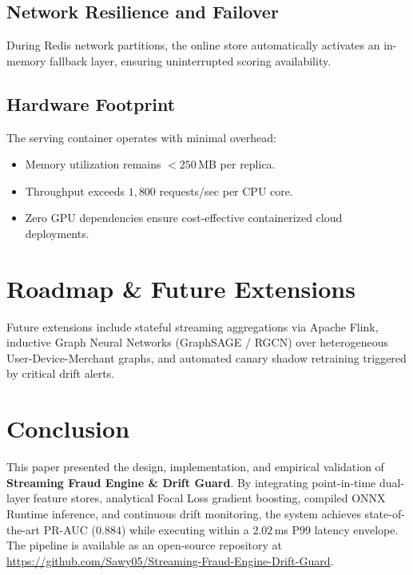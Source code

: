 \subsection{Network Resilience and Failover}
During Redis network partitions, the online store automatically activates an in-memory fallback layer, ensuring uninterrupted scoring availability.

\subsection{Hardware Footprint}
The serving container operates with minimal overhead:
\begin{itemize}
    \item Memory utilization remains $< 250$\,MB per replica.
    \item Throughput exceeds $1,800$ requests/sec per CPU core.
    \item Zero GPU dependencies ensure cost-effective containerized cloud deployments.
\end{itemize}

\section{Roadmap \& Future Extensions}
\label{sec:roadmap}
Future extensions include stateful streaming aggregations via Apache Flink, inductive Graph Neural Networks (GraphSAGE / RGCN) over heterogeneous User-Device-Merchant graphs, and automated canary shadow retraining triggered by critical drift alerts.

\section{Conclusion}
\label{sec:conclusion}
This paper presented the design, implementation, and empirical validation of \textbf{Streaming Fraud Engine \& Drift Guard}. By integrating point-in-time dual-layer feature stores, analytical Focal Loss gradient boosting, compiled ONNX Runtime inference, and continuous drift monitoring, the system achieves state-of-the-art PR-AUC ($0.884$) while executing within a $2.02$\,ms P99 latency envelope. The pipeline is available as an open-source repository at \url{https://github.com/Sawy05/Streaming-Fraud-Engine-Drift-Guard}.
